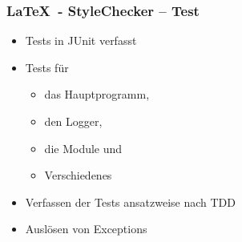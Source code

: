 \begin{frame}
\frametitle{\LaTeX~- StyleChecker -- Test}
\begin{block}{\vspace*{-3ex}}
	\begin{itemize}
		\item Tests in JUnit verfasst
		\item Tests für
		\begin{itemize}
			\item das Hauptprogramm,
			\item den Logger,
			\item die Module und
			\item Verschiedenes
		\end{itemize}
		\item Verfassen der Tests ansatzweise nach TDD
		\item Auslösen von Exceptions
	\end{itemize}
\end{block}
\end{frame}